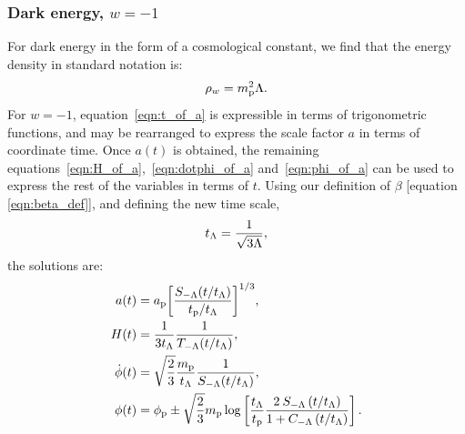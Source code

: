 \subsubsection{Dark energy, $w=-1$}
For dark energy in the form of a cosmological constant, we find that the energy density in standard notation is:
%
\begin{equation}
  \rho_w = m_{\mathrm{p}}^2\Lambda.
\end{equation}
%
For $w=-1$, equation~\eqref{eqn:t_of_a} is expressible in terms of trigonometric functions, and may be rearranged to express the scale factor $a$ in terms of coordinate time. Once $a(t)$ is obtained, the remaining equations~\eqref{eqn:H_of_a},~\eqref{eqn:dotphi_of_a} and~\eqref{eqn:phi_of_a} can be used to express the rest of the variables in terms of $t$. Using our definition of $\beta$ [equation \nolinebreak\ref{eqn:beta_def}], and defining the new time scale,
%
\begin{equation}
  t_\mathrm{\Lambda} = \frac{1}{\sqrt{3\Lambda}},
  \label{eqn:tl}
\end{equation}
%
the solutions are:
%
\begin{align}
  a(t)
  &=
  a_{\mathrm{p}}{\left[{\frac {S_{-\Lambda}(t/t_\mathrm{\Lambda})}{t_{\mathrm{p}}/t_\mathrm{\Lambda}}}\right]}^{1/3},
  \\
  H(t)
  &=
  \frac{1}{3t_\mathrm{\Lambda}}\frac{1}{T_{-\Lambda}(t/t_\mathrm{\Lambda})},
  \\
  \dot{\phi}(t)
  &=
  \sqrt{\frac{2}{3}}\frac{m_{\mathrm{p}}}{t_\mathrm{\Lambda}}\frac{1}{S_{-\Lambda}(t/t_\mathrm{\Lambda})},
  \\
  \phi(t)
  &=
  \phi_{\mathrm{p}} \pm \sqrt{\frac{2}{3}}m_{\mathrm{p}}
  \log\left[
  \frac{t_\mathrm{\Lambda}}{t_{\mathrm{p}}} 
  \frac 
  {2\: S_{-\Lambda} \left( t/t_\mathrm{\Lambda} \right) }
  {1 + C_{-\Lambda} \left( t/t_\mathrm{\Lambda} \right)}  
  \right].
\end{align}
%

